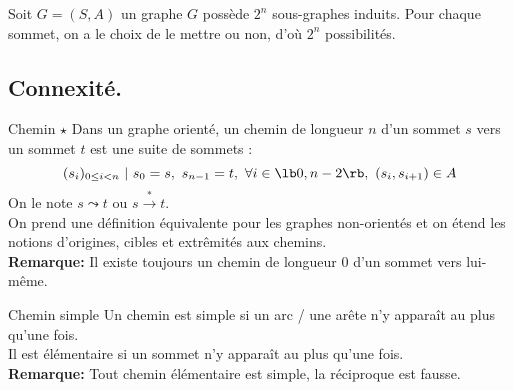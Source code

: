 \documentclass[french, 11pt]{article}
\begin{document}
\begin{prop}{}{}
    Soit $G=(S,A)$ un graphe $G$ possède $2^n$ sous-graphes induits.
    \tcblower
    Pour chaque sommet, on a le choix de le mettre ou non, d'où $2^n$ possibilités.
\end{prop}

\subsection{Connexité.}

\begin{defi}{Chemin $\star$}{}
    Dans un graphe orienté, un chemin de longueur $n$ d'un sommet $s$ vers un sommet $t$ est une suite de sommets :
    \begin{equation*}
        (s_i)_{0\leq i<n} ~ | ~ s_0=s, ~ s_{n-1}=t, ~ \forall i\in\lb0,n-2\rb, ~ (s_i,s_{i+1}) \in A
    \end{equation*}
    On le note $s\leadsto t$ ou $s\overset{*}{\to}t$.\\
    On prend une définition équivalente pour les graphes non-orientés et on étend les notions d'origines, cibles et extrêmités aux chemins.\\
    \textbf{Remarque:} Il existe toujours un chemin de longueur 0 d'un sommet vers lui-même.
\end{defi}

\begin{defi}{Chemin simple}{}
    Un chemin est simple si un arc / une arête n'y apparaît au plus qu'une fois.\\
    Il est élémentaire si un sommet n'y apparaît au plus qu'une fois.\\
    \textbf{Remarque:} Tout chemin élémentaire est simple, la réciproque est fausse.
\end{defi}
\end{document}
